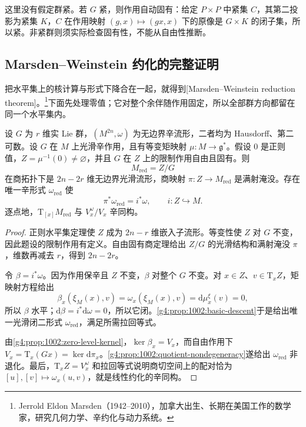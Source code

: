 这里没有假定群紧。若 \(G\) 紧，则作用自动固有：给定 \(P\times P\) 中紧集 \(C\)，其第二投影为紧集 \(K\)，\(C\) 在作用映射 \((g,x)\mapsto(gx,x)\) 下的原像是 \(G\times K\) 的闭子集，所以紧。非紧群则须实际检查固有性，不能从自由性推断。

\subsection{Marsden–Weinstein 约化的完整证明}
\label{g4:subsec:1002:05}

把水平集上的核计算与形式下降合在一起，就得到[Marsden--Weinstein reduction theorem]。\footnote{Jerrold Eldon Marsden（1942--2010），加拿大出生、长期在美国工作的数学家，研究几何力学、辛约化与动力系统。}下面先处理零值；它对整个余伴随作用固定，所以全部群方向都留在同一个水平集内。

\begin{theorem}\label{g4:thm:1002:symplectic-reduction}
	设 \(G\) 为 \(r\) 维实 Lie 群，\((M^{2n},\omega)\) 为无边界辛流形，二者均为 Hausdorff、第二可数。设 \(G\) 在 \(M\) 上光滑辛作用，且有等变矩映射 \(\mu:M\to\mathfrak g^*\)。假设 \(0\) 是正则值，\(Z=\mu^{-1}(0)\ne\varnothing\)，并且 \(G\) 在 \(Z\) 上的限制作用自由且固有。则
	\[
		M_{\mathrm{red}}=Z/G
	\]
	在商拓扑下是 \(2n-2r\) 维无边界光滑流形，商映射 \(\pi:Z\to M_{\mathrm{red}}\) 是满射淹没。存在唯一辛形式 \(\omega_{\mathrm{red}}\) 使
	\begin{equation}\label{g4:eq:1002:reduction-pullback}
		\pi^*\omega_{\mathrm{red}}=i^*\omega,
		\qquad i:Z\hookrightarrow M.
	\end{equation}
	逐点地，\(\mathrm{T}_{[x]}M_{\mathrm{red}}\) 与 \(V_x^\omega/V_x\) 辛同构。
\end{theorem}
\begin{proof}
	正则水平集定理使 \(Z\) 成为 \(2n-r\) 维嵌入子流形。等变性使 \(Z\) 对 \(G\) 不变，因此题设的限制作用有定义。自由固有商定理给出 \(Z/G\) 的光滑结构和满射淹没 \(\pi\)，维数再减去 \(r\)，得到 \(2n-2r\)。

	令 \(\beta=i^*\omega\)。因为作用保辛且 \(Z\) 不变，\(\beta\) 对整个 \(G\) 不变。对 \(x\in Z\)、\(v\in\mathrm{T}_xZ\)，矩映射方程给出
	\[
		\beta_x(\xi_M(x),v)
		=\omega_x(\xi_M(x),v)
		=\mathrm{d}\mu^\xi_x(v)=0,
	\]
	所以 \(\beta\) 水平；\(\mathrm{d}\beta=i^*\mathrm{d}\omega=0\)，所以它闭。\cref{g4:prop:1002:basic-descent}于是给出唯一光滑闭二形式 \(\omega_{\mathrm{red}}\)，满足所需拉回等式。

	由\cref{g4:prop:1002:zero-level-kernel}，\(\ker\beta_x=V_x\)，而自由作用下 \(V_x=\mathrm{T}_x(Gx)=\ker\mathrm{d}\pi_x\)。\cref{g4:prop:1002:quotient-nondegeneracy}遂给出 \(\omega_{\mathrm{red}}\) 非退化。最后，\(\mathrm{T}_xZ=V_x^\omega\) 和拉回等式说明商切空间上的配对恰为 \([u],[v]\mapsto\omega_x(u,v)\)，就是线性约化的辛同构。
\end{proof}

